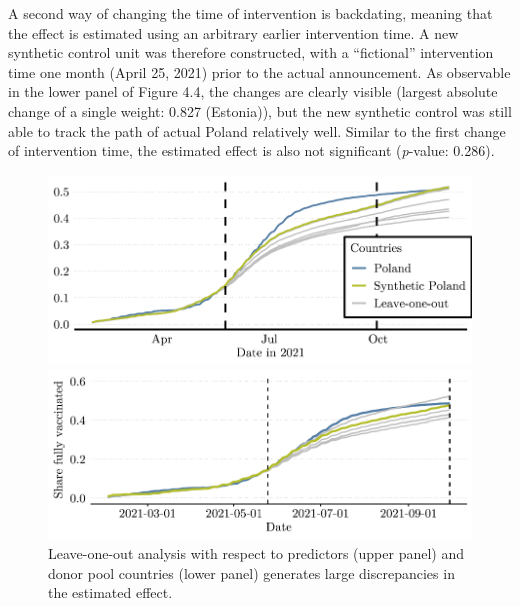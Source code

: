 \documentclass{scrbook}
\begin{document}
A second way of changing the time of intervention is backdating, meaning
that the effect is estimated using an arbitrary earlier intervention
time. A new synthetic control unit was therefore constructed, with a
``fictional'' intervention time one month (April 25, 2021) prior to the
actual announcement. As observable in the lower panel of Figure 4.4, the
changes are clearly visible (largest absolute change of a single weight:
0.827 (Estonia)), but the new synthetic control was still able to track
the path of actual Poland relatively well. Similar to the first change
of intervention time, the estimated effect is also not significant
(\textit{p}-value: 0.286).

\begin{figure}[h]
\caption[Robustness check: Leave-one-out analysis]{Leave-one-out analysis with respect to predictors (upper panel) and donor pool countries (lower panel) generates large discrepancies in the estimated effect.}

\begin{center}\includegraphics{bachelor_thesis_files/figure-latex/unnamed-chunk-6-1} \end{center}



\begin{center}\includegraphics{bachelor_thesis_files/figure-latex/unnamed-chunk-6-2} \end{center}
\end{figure}
\end{document}
